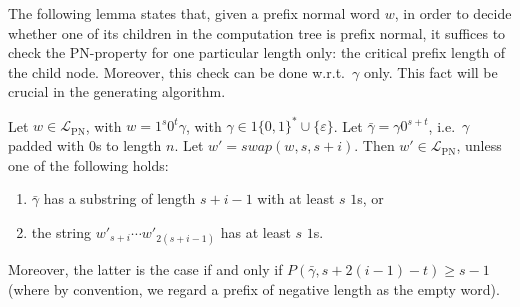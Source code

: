 \documentclass[11pt,a4paper]{llncs}
\def\swap{\textit{swap}}
\renewcommand{\epsilon}{\varepsilon}
\newcommand{\LPN}{{\mathcal L}_{\textrm{PN}}}
\begin{document}
The following lemma states that, given a prefix normal word $w$, in order to decide whether one of its children in the computation tree is prefix normal, it suffices to check the PN-property for one particular length only: the critical prefix length of the child node. Moreover, this check can be done w.r.t.\ $\gamma$ only. This fact will be crucial in the generating algorithm.

\begin{lemma}\label{lemma:isPNF}
Let $w\in \LPN$, with $w=1^s0^t\gamma$, with $\gamma \in 1\{0,1\}^* \cup \{\epsilon\}$. Let $\bar\gamma = \gamma 0^{s+t}$, i.e.\ $\gamma$ padded with $0$s to length $n$. Let $w' = \swap(w,s,s+i)$. Then $w'\in \LPN$, unless one of the following holds:


\begin{enumerate}
\item $\bar\gamma$ has a substring of length $s+i-1$ with at least $s$ $1$s, or 
\item the string $w'_{s+i} \cdots w'_{2(s+i-1)}$ has at least $s$ $1$s.
\end{enumerate}

Moreover, the latter is the case if and only if $P(\bar\gamma, s + 2(i-1) - t) \geq s-1$ (where by convention, we regard a prefix of negative length as the empty word).

\end{lemma}
\end{document}
